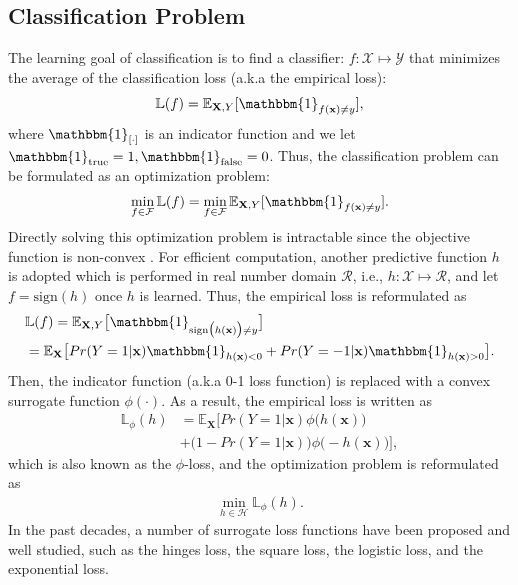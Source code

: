 \documentclass[letterpaper]{article} %
\newcommand{\X}{\mathbf{X}}
\newcommand{\x}{\mathbf{x}}
\newcommand{\Y}{Y}
\newcommand{\y}{y}
\newcommand{\E}{\mathbb{E}}
\newcommand{\I}{\mathbbm{1}}
\newcommand{\sign}{\textrm{sign}}
\newcommand{\Loss}{\mathbb{L}}
\begin{document}
\subsection{Classification Problem}
The learning goal of classification is to find a classifier: $f \colon \mathcal{X} \mapsto \mathcal{Y}$ that minimizes the average of the classification loss (a.k.a the empirical loss):
\begin{equation*}
	\Loss (f) =  \E_{\X, \Y} [ \I_{f(\x) \neq \y} ] ,
\end{equation*}
where $\I_{[\cdot]}$ is an indicator function and we let $ \I_{\mathrm{true}} = 1, \I_{\mathrm{false}}=0 $. Thus, the classification problem can be formulated as an optimization problem:
\begin{align*}
	\min_{f \in \mathcal{F}} \Loss(f) = \min_{f \in \mathcal{F}} \E_{\X, \Y} [ \I_{f(\x) \neq \y} ].
\end{align*}
Directly solving this optimization problem is intractable since the objective function is non-convex \cite{Bartlett2006}. For efficient computation, another predictive function $h$ is adopted which is performed in real number domain $\mathcal{R}$, i.e., $h \colon  \mathcal{X} \mapsto \mathcal{R}$, and let $f = \sign(h) $ once $h$ is learned. Thus, the empirical loss is reformulated as
\begin{align*}
&	\Loss (f) = \E_{\X, \Y} \big[ \I_{\sign \big( h(\x) \big) \neq \y} \big]                     \\
&	          = \E_{\X} \big[ Pr(\Y=1|\x) \I_{h(\x) < 0} +    Pr(\Y=-1|\x) \I_{h(\x) > 0} \big].
\end{align*}
Then, the indicator function (a.k.a 0-1 loss function) is replaced with a convex surrogate function $\phi(\cdot)$. As a result, the empirical loss is written as
\begin{align*}
	\Loss_{\phi} (h) & = \E_{\X} \big[ Pr(Y=1|\x) \phi \big(h(\x) \big)            \\
	                 & + \big(1 - Pr(Y=1|\x) \big) \phi \big( - h(\x) \big) \big],
\end{align*}
which is also known as the $\phi$-loss, and the optimization problem is reformulated as
\begin{eqnarray}
	\min_{ h \in \mathcal{H}} \Loss_{\phi} (h).
	\label{opt:standard_classification}
\end{eqnarray}
In the past decades, a number of surrogate loss functions have been proposed and well studied, such as the hinges loss, the square loss, the logistic loss, and the exponential loss.
\end{document}
